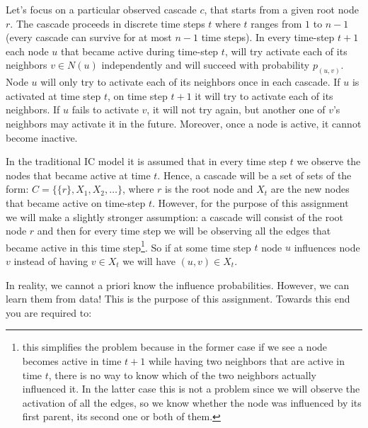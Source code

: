 \documentclass[11pt]{article}
\theoremstyle{definition} \newtheorem{Theorem}{theorem}
\begin{document}
Let's focus on a particular observed cascade $c$, that starts from a given root node $r$. The cascade proceeds in discrete time steps $t$ where $t$ ranges from $1$ to $n-1$ (every cascade can survive for at most $n-1$ time steps). In every time-step $t+1$ each node $u$ that became active during time-step $t$, will try activate each of its neighbors $v \in N(u)$ independently and will succeed with probability $p_{(u,v)}$. Node $u$ will only try to activate each of its neighbors once in each cascade. If $u$ is activated at time step $t$, on time step $t+1$ it will try to activate each of its neighbors. If $u$ fails to activate $v$, it will not try again, but another one of $v$'s neighbors may activate it in the future. Moreover, once a node is active, it cannot become inactive.

In the traditional IC model it is assumed that in every time step $t$ we observe the nodes that became active at time $t$. Hence, a cascade will be a set of sets of the form: $C = \{\{r\}, X_1, X_2, \ldots\}$, where $r$ is the root node and $X_t$ are the new nodes that became active on time-step $t$. However, for the purpose of this assignment we will make a slightly stronger assumption: a cascade will consist of the root node $r$ and then for every time step we will be observing all the edges that became active in this time step\footnote{this simplifies the problem because in the former case if we see a node becomes active in time $t+1$ while having two neighbors that are active in time $t$, there is no way to know which of the two neighbors actually influenced it. In the latter case this is not a problem since we will observe the activation of all the edges, so we know whether the node was influenced by its first parent, its second one or both of them.}. So if at some time step $t$ node $u$ influences node $v$ instead of having $v \in X_t$ we will have $(u,v) \in X_t$.

In reality, we cannot a priori know the influence probabilities. However, we can learn them from data! This is the purpose of this assignment. Towards this end you are required to:
\end{document}
